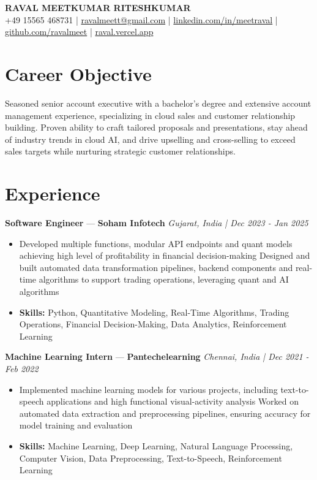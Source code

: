\documentclass[a4paper,10pt]{article}
\begin{document}
\begin{center}
  {\Large\bfseries RAVAL MEETKUMAR RITESHKUMAR}\\[2pt]
  {\small +49 15565 468731 \;|\; \href{mailto:ravalmeett@gmail.com}{ravalmeett@gmail.com} \;|\; \href{https://www.linkedin.com/in/meetraval/}{linkedin.com/in/meetraval} \;|\; \href{https://github.com/ravalmeet}{github.com/ravalmeet} \;|\; \href{https://raval.vercel.app/}{raval.vercel.app}}
\end{center}
\vspace{-3pt}

\section*{Career Objective}
Seasoned senior account executive with a bachelor's degree and extensive account management experience, specializing in cloud sales and customer relationship building. Proven ability to craft tailored proposals and presentations, stay ahead of industry trends in cloud AI, and drive upselling and cross-selling to exceed sales targets while nurturing strategic customer relationships.\par

\section*{Experience}
\textbf{Software Engineer} — \textbf{Soham Infotech} \hfill \textit{Gujarat, India \;|\; Dec 2023 - Jan 2025}\par
\vspace{1pt}
\begin{itemize}
  \item Developed multiple functions, modular API endpoints and quant models achieving high level of profitability in financial decision-making Designed and built automated data transformation pipelines, backend components and real-time algorithms to support trading operations, leveraging quant and AI algorithms
  \item \textbf{Skills:} Python, Quantitative Modeling, Real-Time Algorithms, Trading Operations, Financial Decision-Making, Data Analytics, Reinforcement Learning
\end{itemize}
\vspace{3pt}
\textbf{Machine Learning Intern} — \textbf{Pantechelearning} \hfill \textit{Chennai, India \;|\; Dec 2021 - Feb 2022}\par
\vspace{1pt}
\begin{itemize}
  \item Implemented machine learning models for various projects, including text-to-speech applications and high functional visual-activity analysis Worked on automated data extraction and preprocessing pipelines, ensuring accuracy for model training and evaluation
  \item \textbf{Skills:} Machine Learning, Deep Learning, Natural Language Processing, Computer Vision, Data Preprocessing, Text-to-Speech, Reinforcement Learning
\end{itemize}
\end{document}
